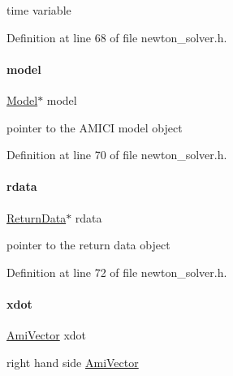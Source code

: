time variable 

Definition at line 68 of file newton\+\_\+solver.\+h.

\mbox{\label{classamici_1_1_newton_solver_a7b56c3ca57dde73bdbc8dbe9772bca19}} 
\paragraph{\texorpdfstring{model}{model}}
{\footnotesize\ttfamily \mbox{\hyperlink{classamici_1_1_model}{Model}}$\ast$ model\hspace{0.3cm}{\ttfamily [protected]}}

pointer to the A\+M\+I\+CI model object 

Definition at line 70 of file newton\+\_\+solver.\+h.

\mbox{\label{classamici_1_1_newton_solver_a4c0807651f0594a186e8856f22e442cc}} 
\paragraph{\texorpdfstring{rdata}{rdata}}
{\footnotesize\ttfamily \mbox{\hyperlink{classamici_1_1_return_data}{Return\+Data}}$\ast$ rdata\hspace{0.3cm}{\ttfamily [protected]}}

pointer to the return data object 

Definition at line 72 of file newton\+\_\+solver.\+h.

\mbox{\label{classamici_1_1_newton_solver_a6329150d913cecfe54dad5fd03214ce8}} 
\paragraph{\texorpdfstring{xdot}{xdot}}
{\footnotesize\ttfamily \mbox{\hyperlink{classamici_1_1_ami_vector}{Ami\+Vector}} xdot\hspace{0.3cm}{\ttfamily [protected]}}

right hand side \mbox{\hyperlink{classamici_1_1_ami_vector}{Ami\+Vector}} 


